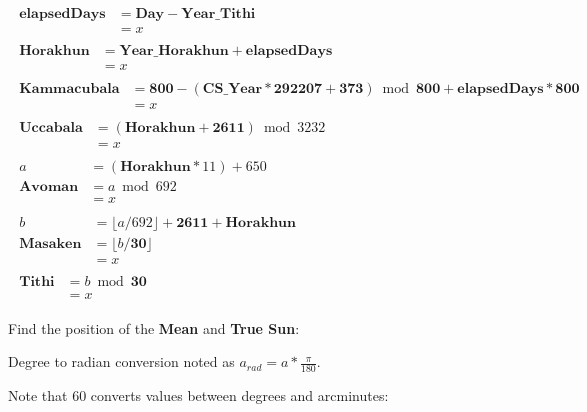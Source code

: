 \documentclass[11pt,oneside]{memoir-article}
\begin{document}
\begin{align}
\begin{split}
   \mathbf{elapsedDays} &= \mathbf{Day} - \mathbf{Year\_Tithi}\\
                        &= x
\end{split}\\
\begin{split}
   \mathbf{Horakhun}    &= \mathbf{Year\_Horakhun} + \mathbf{elapsedDays}\\
                        &= x
\end{split}\\
\begin{split}
  \mathbf{Kammacubala}  &= \mathbf{800} - (\mathbf{CS\_Year} * \mathbf{292207} + \mathbf{373}) \bmod \mathbf{800} + \mathbf{elapsedDays} * \mathbf{800}\\
                        &= x
\end{split}\\
\begin{split}
  \mathbf{Uccabala}     &= (\mathbf{Horakhun} + \mathbf{2611}) \bmod 3232\\
                        &= x
\end{split}\\
\begin{split}
                      a &= (\mathbf{Horakhun} * 11) + 650\\
        \mathbf{Avoman} &= a \bmod 692\\
                        &= x
\end{split}\\
\begin{split}
                      b &= \lfloor a / 692 \rfloor + \mathbf{2611} + \mathbf{Horakhun}\\
       \mathbf{Masaken} &= \lfloor b / \mathbf{30} \rfloor\\
                        &= x
\end{split}\\
\begin{split}
         \mathbf{Tithi} &= b \bmod \mathbf{30}\\
                        &= x
\end{split}
\end{align}

Find the position of the \textbf{Mean} and \textbf{True Sun}:

Degree to radian conversion noted as $a_{rad} = a * \frac{\pi}{180}$.

Note that 60 converts values between degrees and arcminutes: 
\end{document}
